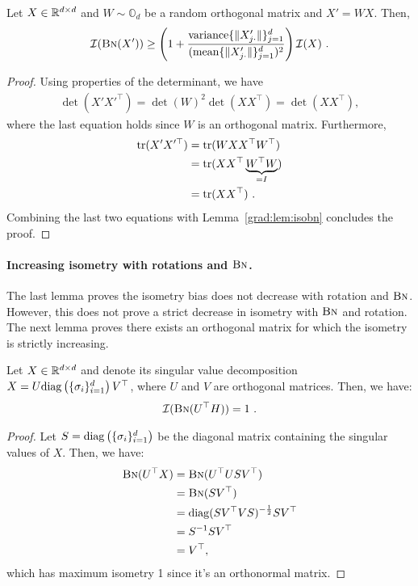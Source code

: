 \begin{lemma}
Let $X \in \mathbb{R}^{d\times d}$ and $W \sim \mathbb{O}_d$ be a random orthogonal matrix and $X'= W X$. Then,  
\begin{align}
   \mathcal{I}(\text{\sc{Bn}}(X'))\geq \left(1+ \frac{\text{variance}\{\|X'_{j\cdot}\|\}_{j=1}^d}{(\text{mean} \{\|X'_{j\cdot}\|\}_{j=1}^d)^2}\right) \mathcal{I}(X)~.
\end{align}
\end{lemma}
%
\begin{proof}
   Using properties of the determinant, we have 
   \begin{align}
       \det(X' X'^\top ) = \det(W)^2 \det(XX^\top) =  \det(XX^\top),
   \end{align}
   where the last equation holds since $W$ is an orthogonal matrix. Furthermore, 
   \begin{align}
    \mathrm{tr}(X' X'^\top) & = \mathrm{tr}(W X X^\top W^\top ) \\
    & = \mathrm{tr}(XX^\top \underbrace{W^\top W}_{=I}) \\
    & = \mathrm{tr}(XX^\top)~.
   \end{align}
Combining the last two equations with Lemma~\ref{grad:lem:isobn} concludes the proof.
\end{proof}

\paragraph{Increasing isometry with rotations and $\text{\sc{Bn}}$.}
The last lemma proves the isometry bias does not decrease with rotation and $\text{\sc{Bn}}$. However, this does not prove a strict decrease in isometry with $\text{\sc{Bn}}$ and rotation. The next lemma proves there exists an orthogonal matrix for which the isometry is strictly increasing. 
\begin{corollary}
\label{grad:cor:isometry_increase}
Let $X \in \mathbb{R}^{d\times d}$ and denote its singular value decomposition $X = U \mathrm{diag}\left(\{\sigma_i\}_{i=1}^d\right) V^\top$, where $U$ and $V$ are orthogonal matrices. Then, we have:
\begin{align}
    \mathcal{I} (\text{\sc{Bn}}(U^\top H)) = 1~.
\end{align}
\end{corollary}
%
\begin{proof} 
Let $S = \mathrm{diag} \left(\{\sigma_i\}_{i=1}^d \right)$ be the diagonal matrix containing the singular values of $X$. Then, we have:
\begin{align}
    \text{\sc{Bn}}(U^\top X) &= \text{\sc{Bn}}(U^\top U S V^\top) \\
    &= \text{\sc{Bn}}(S V^\top) \\
    &= \mathrm{diag}(SV^\top V S)^{-\frac{1}{2}} SV^\top \\
    &= S^{-1} S V^\top \\
    &= V^\top,
\end{align}
which has maximum isometry 1 since it's an orthonormal matrix.
\end{proof}

